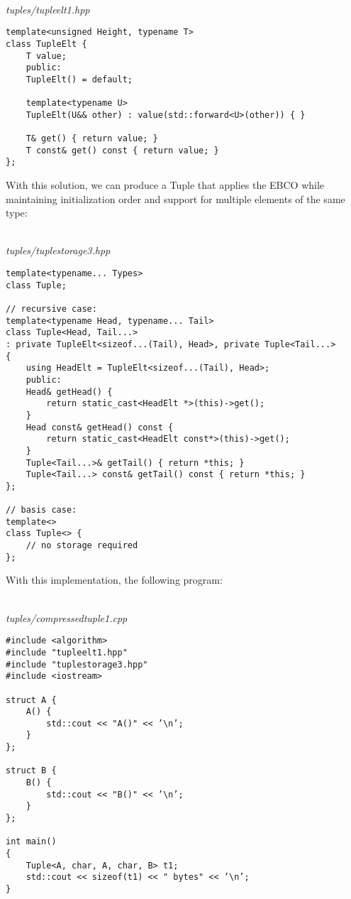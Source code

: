 \hspace*{\fill} \\ %
\noindent
\textit{tuples/tupleelt1.hpp}
\begin{lstlisting}[style=styleCXX]
template<unsigned Height, typename T>
class TupleElt {
	T value;
	public:
	TupleElt() = default;
	
	template<typename U>
	TupleElt(U&& other) : value(std::forward<U>(other)) { }
	
	T& get() { return value; }
	T const& get() const { return value; }
};
\end{lstlisting}

With this solution, we can produce a Tuple that applies the EBCO while maintaining initialization order and support for multiple elements of the same type:

\hspace*{\fill} \\ %
\noindent
\textit{tuples/tuplestorage3.hpp}
\begin{lstlisting}[style=styleCXX]
template<typename... Types>
class Tuple;

// recursive case:
template<typename Head, typename... Tail>
class Tuple<Head, Tail...>
: private TupleElt<sizeof...(Tail), Head>, private Tuple<Tail...>
{
	using HeadElt = TupleElt<sizeof...(Tail), Head>;
	public:
	Head& getHead() {
		return static_cast<HeadElt *>(this)->get();
	}
	Head const& getHead() const {
		return static_cast<HeadElt const*>(this)->get();
	}
	Tuple<Tail...>& getTail() { return *this; }
	Tuple<Tail...> const& getTail() const { return *this; }
};

// basis case:
template<>
class Tuple<> {
	// no storage required
};
\end{lstlisting}

With this implementation, the following program:

\hspace*{\fill} \\ %
\noindent
\textit{tuples/compressedtuple1.cpp}
\begin{lstlisting}[style=styleCXX]
#include <algorithm>
#include "tupleelt1.hpp"
#include "tuplestorage3.hpp"
#include <iostream>

struct A {
	A() {
		std::cout << "A()" << ’\n’;
	}
};

struct B {
	B() {
		std::cout << "B()" << ’\n’;
	}
};

int main()
{
	Tuple<A, char, A, char, B> t1;
	std::cout << sizeof(t1) << " bytes" << ’\n’;
}
\end{lstlisting}

